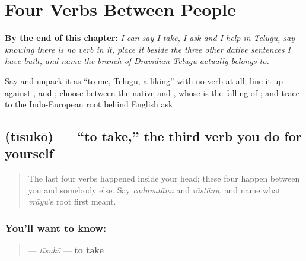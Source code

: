 
\chapter{Four Verbs Between People}
\label{ch:te-verbs-between-people}

\begin{chapteropening}
\textbf{By the end of this chapter:} \emph{I can say I take, I ask and I help in Telugu, say    knowing there is no verb in it, place it beside the three other dative sentences I have built, and name the branch of Dravidian Telugu actually belongs to.}

Say    and unpack it as \textquotedblleft{}to me, Telugu, a liking\textquotedblright{} with no verb at all; line it up against   ,   and  ; choose between the native  and , whose  is the falling of  ; and trace  to the Indo-European root behind English ask.
\end{chapteropening}

\section[\texorpdfstring{\te{తీసుకో} (tīsukō)}{తీసుకో (tīsukō)}]{ (tīsukō) — \textquotedblleft{}to take,\textquotedblright{} the third verb you do for yourself}

\label{lesson:TE-C34-tiisuko}



\begin{quote}
The last four verbs happened inside your head; these four happen between you and somebody else. Say \emph{caduvutānu} and \emph{rāstānu}, and name what \emph{vrāyu}'s root first meant.
\end{quote}

\subsection*{You'll want to know: }
\begin{quote}
\textbf{} — \emph{tīsukō} — \textbf{to take}
\end{quote}

